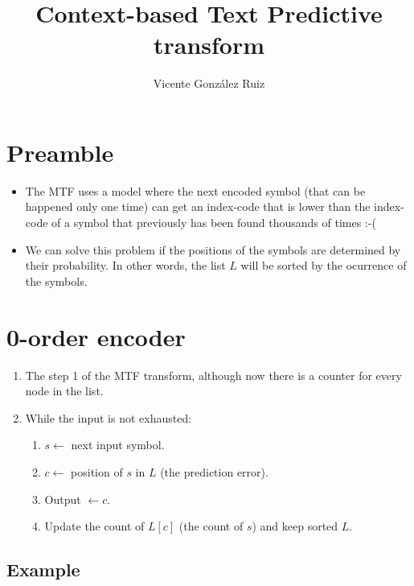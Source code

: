 \title{Context-based Text Predictive transform}
\author{Vicente González Ruiz}
\maketitle
\tableofcontents

\section{Preamble}
\begin{itemize}
\item
  The MTF uses a model where the next encoded symbol (that can be
  happened only one time) can get an index-code that is lower than the
  index-code of a symbol that previously has been found thousands of
  times :-(
\item
  We can solve this problem if the positions of the symbols are
  determined by their probability. In other words, the list \(L\) will
  be sorted by the ocurrence of the symbols.
\end{itemize}

\section{0-order encoder}
\begin{enumerate}
\def\labelenumi{\arabic{enumi}.}
\tightlist
\item
  The step 1 of the MTF transform, although now there is a counter for
  every node in the list.
\item
  While the input is not exhausted:
  \begin{enumerate}
  \def\labelenumii{\arabic{enumii}.}
  \tightlist
  \item
    \(s\leftarrow\) next input symbol.
  \item
    \(c\leftarrow\) position of \(s\) in \(L\) (the prediction error).
  \item
    Output \(\leftarrow c\).
  \item
    Update the count of \(L[c]\) (the count of \(s\)) and keep sorted
    \(L\).
  \end{enumerate}
\end{enumerate}

\subsection{Example}

